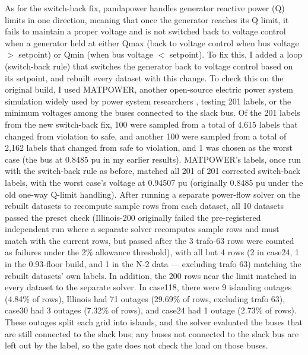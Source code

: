 \documentclass[12pt]{article}
\begin{document}
As for the switch-back fix, pandapower handles generator reactive power (Q) limits in one direction, meaning that once the generator reaches its Q limit, it fails to maintain a proper voltage and is not switched back to voltage control when a generator held at either Qmax (back to voltage control when bus voltage $>$ setpoint) or Qmin (when bus voltage $<$ setpoint). To fix this, I added a loop (switch-back rule) that switches the generator back to voltage control based on its setpoint, and rebuilt every dataset with this change. To check this on the original build, I used MATPOWER, another open-source electric power system simulation widely used by power system researchers \cite{matpower}, testing 201 labels, or the minimum voltages among the buses connected to the slack bus. Of the 201 labels from the new switch-back fix, 100 were sampled from a total of 4,615 labels that changed from violation to safe, and another 100 were sampled from a total of 2,162 labels that changed from safe to violation, and 1 was chosen as the worst case (the bus at 0.8485 pu in my earlier results). MATPOWER's labels, once run with the switch-back rule as before, matched all 201 of 201 corrected switch-back labels, with the worst case's voltage at 0.94507 pu (originally 0.8485 pu under the old one-way Q-limit handling). After running a separate power-flow solver on the rebuilt datasets to recompute sample rows from each dataset, all 10 datasets passed the preset check (Illinois-200 originally failed the pre-registered independent run where a separate solver recomputes sample rows and must match with the current rows, but passed after the 3 trafo-63 rows were counted as failures under the 2\% allowance threshold), with all but 4 rows (2 in case24, 1 in the 0.93-floor build, and 1 in the N-2 data — excluding trafo 63) matching the rebuilt datasets’ own labels. In addition, the 200 rows near the limit matched in every dataset to the separate solver. In case118, there were 9 islanding outages (4.84\% of rows), Illinois had 71 outages (29.69\% of rows, excluding trafo 63), case30 had 3 outages (7.32\% of rows), and case24 had 1 outage (2.73\% of rows). These outages split each grid into islands, and the solver evaluated the buses that are still connected to the slack bus; any buses not connected to the slack bus are left out by the label, so the gate does not check the load on those buses.
\end{document}
